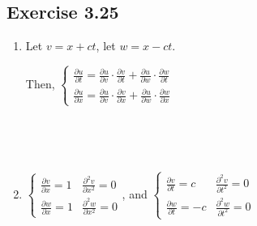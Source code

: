 \documentclass[11pt,fleqn]{book} %
\begin{document}
{~~~}

\subsection*{Exercise 3.25}

\begin{enumerate}
    \item Let $v = x + ct$, let $w = x - ct$. 
    
    Then, $\begin{cases}
            \frac{\partial u}{\partial t} = \frac{\partial u}{\partial v} \cdot \frac{\partial v}{\partial t} + \frac{\partial u}{\partial w} \cdot \frac{\partial w}{\partial t} \\
            \frac{\partial u}{\partial x} = \frac{\partial u}{\partial v} \cdot \frac{\partial v}{\partial x} + \frac{\partial u}{\partial w} \cdot \frac{\partial w}{\partial x}
    \end{cases}$

    {~~~}
    
    {~~~}

    \item $\begin{cases}
        \frac{\partial v}{\partial x} = 1  & \frac{\partial^2 v}{\partial x^2} = 0 \\
        \frac{\partial w}{\partial x} = 1  & \frac{\partial^2 w}{\partial x^2} = 0
    \end{cases}$, and $\begin{cases}
        \frac{\partial v}{\partial t} = c  & \frac{\partial^2 v}{\partial t^2} = 0 \\
        \frac{\partial w}{\partial t} = -c & \frac{\partial^2 w}{\partial t^2} = 0 
    \end{cases}$
    
    {~~~}

    {~~~}
    

\end{enumerate}
\end{document}
